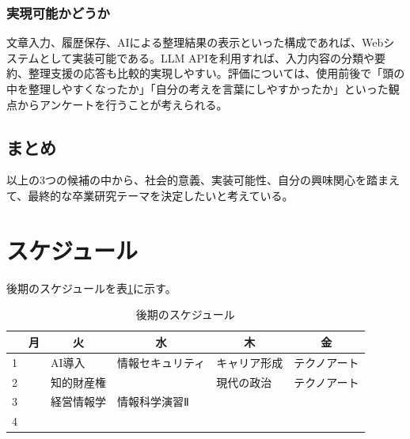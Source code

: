 \documentclass[a4paper,12pt]{ujarticle}
\newcommand{\thc}[1]{\multicolumn{1}{c|}{#1}}
\begin{document}
\subsubsection{実現可能かどうか}
文章入力、履歴保存、AIによる整理結果の表示といった構成であれば、Webシステムとして実装可能である。LLM APIを利用すれば、入力内容の分類や要約、整理支援の応答も比較的実現しやすい。評価については、使用前後で「頭の中を整理しやすくなったか」「自分の考えを言葉にしやすかったか」といった観点からアンケートを行うことが考えられる。

\subsection*{まとめ}
以上の3つの候補の中から、社会的意義、実装可能性、自分の興味関心を踏まえて、最終的な卒業研究テーマを決定したいと考えている。



\section{スケジュール}\label{sec:schedule}
後期のスケジュールを表\ref{tab:studyschedule}に示す。

\begin{table}[H]
  \caption{後期のスケジュール}\label{tab:studyschedule}
  \centering
  \begin{tabular}{|p{4mm}||p{30mm}|p{30mm}|p{30mm}|p{30mm}|p{30mm}|}\hline
        & \thc{月} & \thc{火} & \thc{水} & \thc{木} & \thc{金} \\ \hline\hline
     1  &     & AI導入    &情報セキュリティ     & キャリア形成 & テクノアート  \\ \hline
     2  &     & 知的財産権 &  & 現代の政治 & テクノアート \\ \hline
     3  &     & 経営情報学 & 情報科学演習Ⅱ &  &  \\ \hline
     4  &  &  & &  & \\ \hline
  \end{tabular}
\end{table}
\end{document}
